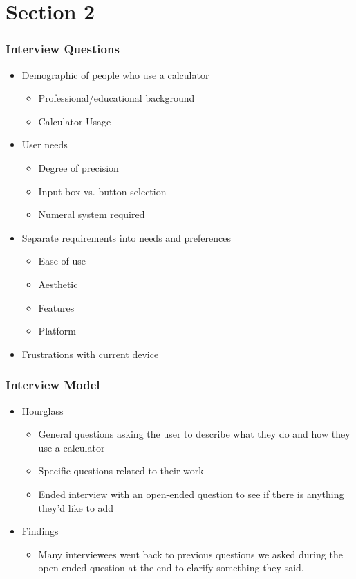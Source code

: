 \documentclass{beamer}
\begin{document}
\section{Section 2}
\begin{frame}
\frametitle{Interview Questions}
\begin{itemize}
\item Demographic of people who use a calculator
\begin{itemize}
\item Professional/educational background
\item Calculator Usage
\end{itemize}
\item User needs
\begin{itemize}
\item Degree of precision
\item Input box vs. button selection
\item Numeral system required
\end{itemize}
\item Separate requirements into needs and preferences
\begin{itemize}
\item Ease of use
\item Aesthetic
\item Features
\item Platform
\end{itemize}
\item Frustrations with current device
\end{itemize}
\end{frame}
\begin{frame}
\frametitle{Interview Model}
\begin{itemize}
\item Hourglass
\begin{itemize}
\item General questions asking the user to describe what they do and how they use a calculator
\item Specific questions related to their work
\item Ended interview with an open-ended question to see if there is anything they'd like to add
\end{itemize}
\item Findings
\begin{itemize}
\item Many interviewees went back to previous questions we asked during the open-ended question at the end to clarify something they said.
\end{itemize}
\end{itemize}
\end{frame}
\end{document}
